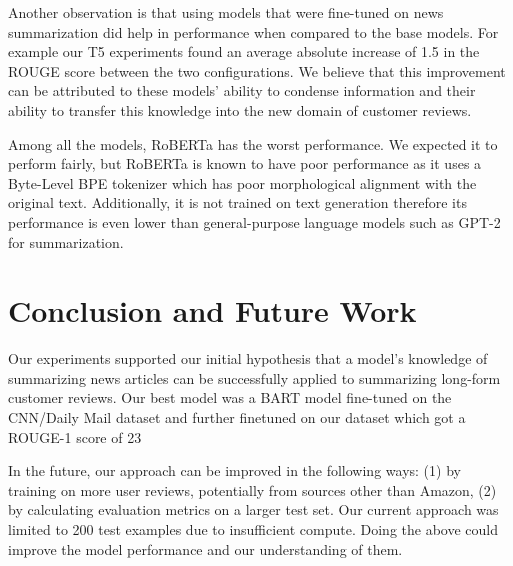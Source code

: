 \documentclass{article}
\begin{document}
Another observation is that using models that were fine-tuned on news summarization did help in performance when compared to the base models. For example our T5 experiments found an average absolute increase of 1.5 in the ROUGE score between the two configurations. We believe that this improvement can be attributed to these models’ ability to condense information and their ability to transfer this knowledge into the new domain of customer reviews.

Among all the models, RoBERTa has the worst performance. We expected it to perform fairly, but RoBERTa is known to have poor performance as it uses a Byte-Level BPE tokenizer which has poor morphological alignment with the original text. Additionally, it is not trained on text generation therefore its performance is even lower than general-purpose language models such as GPT-2 for summarization.


\section{Conclusion and Future Work}
Our experiments supported our initial hypothesis that a model’s knowledge of summarizing news articles can be successfully applied to summarizing long-form customer reviews. Our best model was a BART model fine-tuned on the CNN/Daily Mail dataset and further finetuned on our dataset which got a ROUGE-1 score of 23%

In the future, our approach can be improved in the following ways: (1) by training on more user reviews, potentially from sources other than Amazon, (2) by calculating evaluation metrics on a larger test set. Our current approach was limited to 200 test examples due to insufficient compute. Doing the above could improve the model performance and our understanding of them.
\medskip
\end{document}
